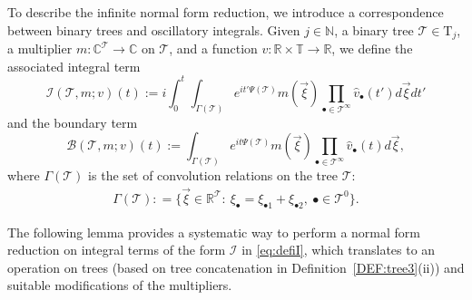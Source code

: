 \documentclass[%
11pt,  reqno]{amsart}
\newcommand{\5}{\textup{V}}
\newcommand{\ft}{\widehat}
\theoremstyle{remark}
\newcommand{\R}{\mathbb{R}}
\newcommand{\bbC}{\mathbb{C}}
\newcommand{\T}{\mathbb{T}}
\newcommand{\bul}{\bullet}
\newcommand{\TT}{\mathcal{T}}
\newcommand{\Tr}{\mathrm{T}}
\newcommand{\G}{\Gamma}
\newcommand{\N}{\mathbb{N}}
\newcommand{\B}{\mathcal{B}}
\newcommand{\Ical}{\mathcal{I}}
\numberwithin{equation}{section}
\numberwithin{theorem}{section}
\begin{document}
To describe the infinite normal form reduction, we introduce a correspondence between binary trees and oscillatory integrals. 
Given $j\in\N$, a binary tree $\TT \in \Tr_j$, a multiplier $m:\bbC^{\TT}\to \bbC$ on $\TT$, and a
function $v: \R\times \T \to\R$, we define the associated integral term
\begin{equation}\label{eq:defiI}
\Ical(\TT, m; v)(t) := i \int_0^t \int_{\G(\TT)}
e^{it'\Psi(\TT)}m(\vec{\xi})
\prod_{\bul\in \TT^\infty}  \ft v_\bul (t') d\vec{\xi}dt'
\end{equation}
and the boundary term
\begin{equation}\label{eq:defiB}
\B(\TT, m;  v )(t) :=\int_{\G(\TT)}
e^{it\Psi(\TT)}m(\vec{\xi})
\prod_{\bul\in \TT^\infty} \ft v_\bul(t) d\vec{\xi},
\end{equation}
where $\G(\TT)$ is the set of convolution relations on the tree $\TT$:
\begin{align}
\label{Gamma}
\G(\TT) : = \big\{ \vec\xi \in \R^\TT: \ \xi_\bul = \xi_{\bul1} + \xi_{\bul2}, \ \bul \in \TT^0 \big\}. 
\end{align}



The following lemma provides a systematic way to perform a normal form reduction on integral terms of the form $\Ical$ in \eqref{eq:defiI}, which translates to an operation on trees (based on tree concatenation in Definition~\ref{DEF:tree3}(ii)) and suitable modifications of the multipliers. 
\end{document}
